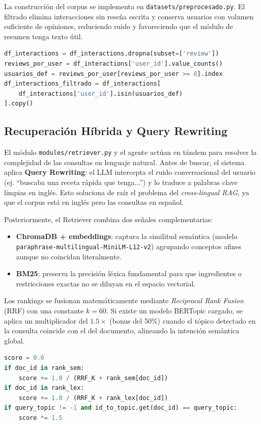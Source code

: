 \documentclass[11pt,a4paper]{article}
\begin{document}
La construcción del corpus se implementa en \texttt{datasets/preprocesado.py}. El filtrado elimina interacciones sin reseña escrita y conserva usuarios con volumen suficiente de opiniones, reduciendo ruido y favoreciendo que el módulo de resumen tenga texto útil.

\begin{lstlisting}[language=python, caption=Filtro de interacciones de calidad.]
df_interactions = df_interactions.dropna(subset=['review'])
reviews_por_user = df_interactions['user_id'].value_counts()
usuarios_def = reviews_por_user[reviews_por_user >= 8].index
df_interactions_filtrado = df_interactions[
    df_interactions['user_id'].isin(usuarios_def)
].copy()
\end{lstlisting}

\subsection{Recuperación Híbrida y Query Rewriting}

El módulo \texttt{modules/retriever.py} y el agente actúan en tándem para resolver la complejidad de las consultas en lenguaje natural. Antes de buscar, el sistema aplica \textbf{Query Rewriting}: el LLM intercepta el ruido conversacional del usuario (ej. ``buscaba una receta rápida que tenga...'') y lo traduce a palabras clave limpias en inglés. Esto soluciona de raíz el problema del \textit{cross-lingual RAG}, ya que el corpus está en inglés pero las consultas en español.

Posteriormente, el Retriever combina dos señales complementarias:
\begin{itemize}
    \item \textbf{ChromaDB + embeddings}: captura la similitud semántica (modelo \texttt{paraphrase-multilingual-MiniLM-L12-v2}) agrupando conceptos afines aunque no coincidan literalmente.
    \item \textbf{BM25}: preserva la precisión léxica fundamental para que ingredientes o restricciones exactas no se diluyan en el espacio vectorial.
\end{itemize}

Los rankings se fusionan matemáticamente mediante \textit{Reciprocal Rank Fusion} (RRF) con una constante $k=60$. Si existe un modelo BERTopic cargado, se aplica un multiplicador del $1.5\times$ (bonus del 50\%) cuando el tópico detectado en la consulta coincide con el del documento, alineando la intención semántica global.

\begin{lstlisting}[language=python, caption=Fusión RRF con refuerzo por tópico.]
score = 0.0
if doc_id in rank_sem:
    score += 1.0 / (RRF_K + rank_sem[doc_id])
if doc_id in rank_lex:
    score += 1.0 / (RRF_K + rank_lex[doc_id])
if query_topic != -1 and id_to_topic.get(doc_id) == query_topic:
    score *= 1.5
\end{lstlisting}
\end{document}
